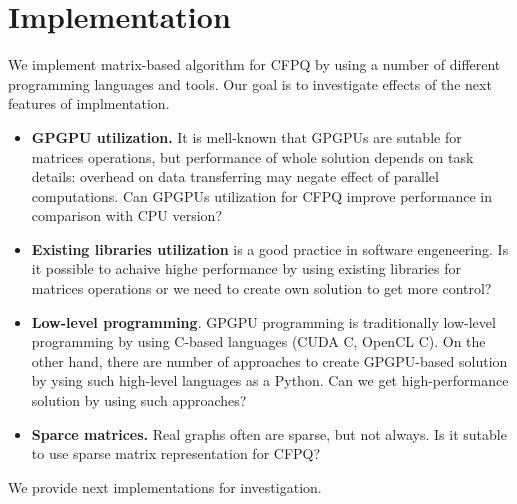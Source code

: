 \section{Implementation}

We implement matrix-based algorithm for CFPQ by using a number of different programming languages and tools.
Our goal is to investigate effects of the next features of implmentation.
\begin{itemize}
\item \textbf{GPGPU utilization.} 
It is mell-known that GPGPUs are sutable for matrices operations, but performance of whole solution depends on task details: overhead on data transferring may negate effect of parallel computations. 
Can GPGPUs utilization for CFPQ improve performance in comparison with CPU version?

\item \textbf{Existing libraries utilization} is a good practice in software engeneering.
Is it possible to achaive highe performance by using existing libraries for matrices operations or we need to create own solution to get more control?

\item \textbf{Low-level programming}. 
GPGPU programming is traditionally low-level programming by using C-based languages (CUDA C, OpenCL C). 
On the other hand, there are number of approaches to create GPGPU-based solution by ysing such high-level languages as a Python. 
Can we get high-performance solution by using such approaches?

\item \textbf{Sparce matrices.} Real graphs often are sparse, but not always.
Is it sutable to use sparse matrix representation for CFPQ? 

\end{itemize}

We provide next implementations for investigation.

